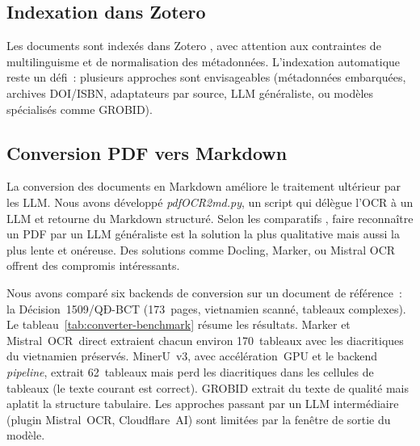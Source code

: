 \documentclass[a4paper,11pt]{report}
\begin{document}
\subsection{Indexation dans Zotero}

Les documents sont indexés dans Zotero \citep{9666795Z}, avec attention aux contraintes de multilinguisme et de normalisation des métadonnées. L'indexation automatique reste un défi~: plusieurs approches sont envisageables (métadonnées embarquées, archives DOI/ISBN, adaptateurs par source, LLM généraliste, ou modèles spécialisés comme GROBID).

\subsection{Conversion PDF vers Markdown}\label{sec:pdf-to-md}

La conversion des documents en Markdown améliore le traitement ultérieur par les LLM. Nous avons développé \emph{pdfOCR2md.py}, un script qui délègue l'OCR à un LLM et retourne du Markdown structuré. Selon les comparatifs \citep{ULQGRISS,RM4KCTEG}, faire reconnaître un PDF par un LLM généraliste est la solution la plus qualitative mais aussi la plus lente et onéreuse. Des solutions comme Docling, Marker, ou Mistral OCR offrent des compromis intéressants.

Nous avons comparé six backends de conversion sur un document de référence~: la Décision~1509/QĐ-BCT (173~pages, vietnamien scanné, tableaux complexes). Le tableau~\ref{tab:converter-benchmark} résume les résultats. Marker et Mistral~OCR~direct extraient chacun environ 170~tableaux avec les diacritiques du vietnamien préservés. MinerU~v3, avec accélération~GPU et le backend \emph{pipeline}, extrait 62~tableaux mais perd les diacritiques dans les cellules de tableaux (le texte courant est correct). GROBID extrait du texte de qualité mais aplatit la structure tabulaire. Les approches passant par un LLM intermédiaire (plugin Mistral~OCR, Cloudflare~AI) sont limitées par la fenêtre de sortie du modèle.

\begin{table}[htbp]
\centering
\caption{Comparaison de six backends de conversion PDF$\to$Markdown sur la Décision~1509 (173~pages). Colonnes~: tableaux détectés, lignes de données extraites, taille du Markdown, temps de traitement, et qualité des diacritiques du vietnamien. Les tirets (--) indiquent des backends ne produisant pas de structure tabulaire exploitable.}\label{tab:converter-benchmark}
\end{table}
\end{document}
